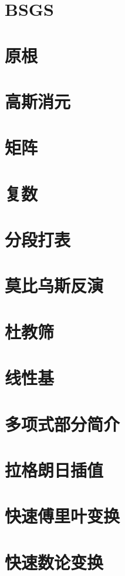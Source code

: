   \section{BSGS}
  
  \section{原根}
  
\section{高斯消元}

\section{矩阵}

\section{复数}

\section{分段打表}

\section{莫比乌斯反演}

\section{杜教筛}

\section{线性基}

  \section{多项式部分简介}
  
  \section{拉格朗日插值}
  
  \section{快速傅里叶变换}
  
  \section{快速数论变换}
  
